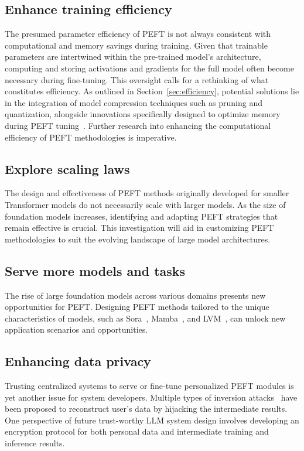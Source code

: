 \subsection{Enhance training efficiency}
The presumed parameter efficiency of PEFT is not always consistent with computational and memory savings during training. Given that trainable parameters are intertwined within the pre-trained model's architecture, computing and storing activations and gradients for the full model often become necessary during fine-tuning. This oversight calls for a rethinking of what constitutes efficiency. As outlined in Section~\ref{sec:efficiency}, potential solutions lie in the integration of model compression techniques such as pruning and quantization, alongside innovations specifically designed to optimize memory during PEFT tuning~\cite{zhang2023camel}. Further research into enhancing the computational efficiency of PEFT methodologies is imperative.

\subsection{Explore scaling laws}
The design and effectiveness of PEFT methods originally developed for smaller Transformer models do not necessarily scale with larger models. As the size of foundation models increases, identifying and adapting PEFT strategies that remain effective is crucial. This investigation will aid in customizing PEFT methodologies to suit the evolving landscape of large model architectures.

\subsection{Serve more models and tasks}
The rise of large foundation models across various domains presents new opportunities for PEFT. Designing PEFT methods tailored to the unique characteristics of models, such as Sora~\cite{videoworldsimulators2024}, Mamba~\cite{gu2023mamba}, and LVM~\cite{bai2023sequential}, can unlock new application scenarios and opportunities. 

\subsection{Enhancing data privacy} Trusting centralized systems to serve or fine-tune personalized PEFT modules is yet another issue for system developers. Multiple types of inversion attacks~\cite{dosovitskiy2016inverting, he2019model} have been proposed to reconstruct user's data by hijacking the intermediate results. One perspective of future trust-worthy LLM system design involves developing an encryption protocol for both personal data and intermediate training and inference results.

